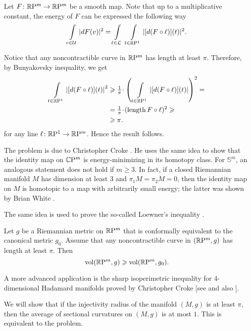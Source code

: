 Let $F\colon\mathbb{R}\mathrm{P}^m\to\mathbb{R}\mathrm{P}^m$ be a smooth map.
Note that up to a multiplicative constant,
the energy of $F$ can be expressed the following way
\[\int\limits_{v\in\mathcal{U}} |dF(v)|^2
=
\int\limits_{\ell\in\mathcal{L}}\ \int\limits_{t\in\mathbb{R}\mathrm{P}^1} |[d(F\circ \ell)](t)|^2.\]

Notice that any noncontractible curve in $\mathbb{R}\mathrm{P}^m$ has length at least $\pi$.
Therefore, by Bunyakovsky inequality, we get
\begin{align*}
\int\limits_{t\in\RP^1} \left|[d(F\circ \ell)](t)\right|^2
&\ge 
\tfrac1\pi\cdot \left(\,\int\limits_{t\in\RP^1} \left|[d(F\circ \ell)](t)\right|\right)^2=
\\
&=\tfrac1\pi\cdot (\length F\circ\ell)^2\ge
\\
&\ge \pi.
\end{align*}
for any line $\ell\colon\mathbb{R}\mathrm{P}^1\to \mathbb{R}\mathrm{P}^m$.
Hence the result follows.\qeds

\label{page:liouville}
The problem is due to Christopher Croke \cite{croke-energy}. 
He uses the same idea to show that the identity map on $\mathbb{C}\mathrm{P}^m$ is energy-minimizing in its homotopy class.
For $\mathbb S^m$, an analogous statement does not hold if $m\ge 3$.
In fact, 
if a closed Riemannian manifold $M$ 
has dimension at least 3 
and $\pi_1M=\pi_2M=0$,
then the identity map on $M$ is homotopic 
to a map with arbitrarily small energy;
the latter was shown by Brian White \cite{white}.

The same idea is used to prove the so-called Loewner's inequality \cite{gromov-filling}.
\begin{pr}
Let $g$ be a Riemannian metric on $\mathbb{R}\mathrm{P}^m$ that is conformally equivalent to the canonical metric $g_0$.
Assume that any noncontractible curve in $(\mathbb{R}\mathrm{P}^m,g)$ has length at least $\pi$.
Then
\[\operatorname{\rm vol}\nolimits(\mathbb{R}\mathrm{P}^m,g)\geqslant\operatorname{\rm vol}\nolimits(\mathbb{R}\mathrm{P}^m,g_0).\]

\end{pr}

A more advanced application is the sharp isoperimetric inequality for 
4-dimensional Hadamard manifolds proved by Christopher Croke [see  and also ].





We will show that 
if the injectivity radius of the manifold $(M,g)$ is at least $\pi$,
then the average of sectional curvatures on $(M,g)$ is at most $1$.
This is equivalent to the problem.

